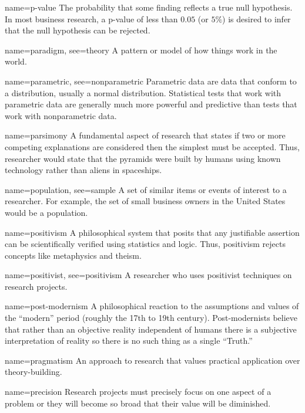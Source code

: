 {name={p-value}}
{%
	The probability that some finding reflects a true null hypothesis. In most business research, a p-value of less than $ 0.05 $ (or $ 5\% $) is desired to infer that the null hypothesis can be rejected.
}

{name={paradigm},
	see={theory}}
{%
	A pattern or model of how things work in the world. 
}

{name={parametric},
	see={nonparametric}}
{%
	Parametric data are data that conform to a distribution, usually a normal distribution. Statistical tests that work with parametric data are generally much more powerful and predictive than tests that work with nonparametric data.
}

	{name={parsimony}}
	{%
		A fundamental aspect of research that states if two or more competing explanations are considered then the simplest must be accepted. Thus, researcher would state that the pyramids were built by humans using known technology rather than aliens in spaceships.
	}

{name={population},
 see={sample}}
{%
	A set of similar items or events of interest to a researcher. For example, the set of small business owners in the United States would be a population.
}

{name={positivism}}
{%
	A philosophical system that posits that any justifiable assertion can be scientifically verified using statistics and logic. Thus, positivism rejects concepts like metaphysics and theism.
}

{name={positivist},
 see={positivism}}
{%
	A researcher who uses positivist techniques on research projects.
}

{name={post-modernism}}
{%
	A philosophical reaction to the assumptions and values of the ``modern'' period (roughly the 17th to 19th century). Post-modernists believe that rather than an objective reality independent of humans there is a subjective interpretation of reality so there is no such thing as a single ``Truth.''
}

{name={pragmatism}}
{%
	An approach to research that values practical application over theory-building. 
}

{name={precision}}
{%
	Research projects must precisely focus on one aspect of a problem or they will become so broad that their value will be diminished.
}

